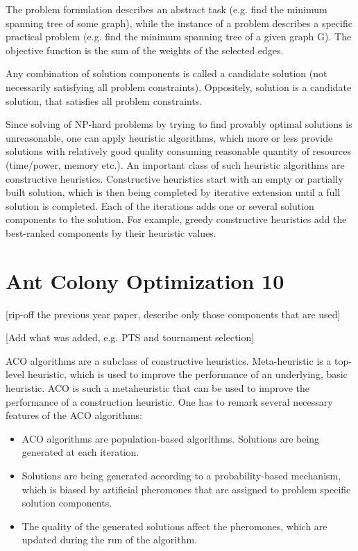 \documentclass[11pt,a4paper,oneside]{book}
\begin{document}
The problem formulation describes an abstract task (e.g. find the minimum spanning tree of some graph), while the instance of a problem describes a specific practical problem (e.g. find the minimum spanning tree of a given graph G). The objective function is the sum of the weights of the selected edges. \par

Any combination of solution components is called a candidate solution (not necessarily satisfying all problem constraints). Oppositely, solution is a candidate solution, that satisfies all problem constraints.

Since solving of NP-hard problems by trying to find provably optimal solutions is unreasonable, one can apply heuristic algorithms, which more or less provide solutions with relatively good quality consuming reasonable quantity of resources (time/power, memory etc.). An important class of such heuristic algorithms are constructive heuristics. Constructive heuristics start with an empty or partially built solution, which is then being completed by iterative extension until a full solution is completed. Each of the iterations adds one or several solution components to the solution. For example, greedy constructive heuristics  add the best-ranked components by their heuristic values.




\section{Ant Colony Optimization 10}

[rip-off the previous year paper, describe only those components that are used] \newline

[Add what was added, e.g. PTS and tournament selection]

ACO algorithms are a subclass of constructive heuristics. Meta-heuristic is a top-level heuristic, which is used to improve the performance of an underlying, basic heuristic. ACO is such a metaheuristic that can be used to improve the performance of a construction heuristic. One has to remark several necessary features of the ACO algorithms:

\begin{itemize}
\item ACO algorithms are population-based algorithms. Solutions are being generated at each iteration.
\item Solutions are being generated according to a probability-based mechanism, which is biased by artificial pheromones that are assigned to problem specific solution components.
\item The quality of the generated solutions affect the pheromones, which are updated during the run of the algorithm.
\end{itemize}
\end{document}
